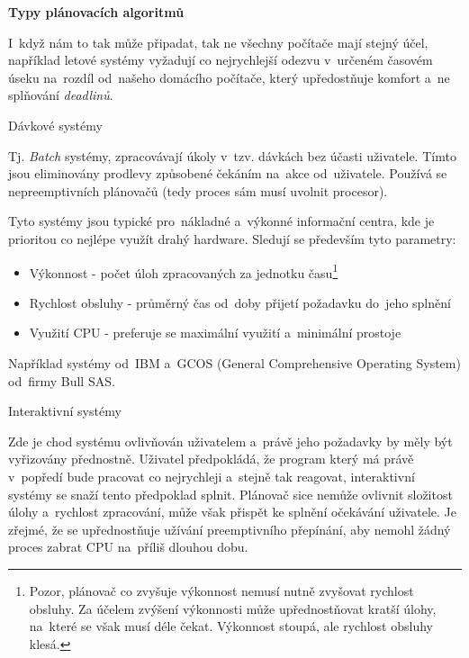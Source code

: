 \begin{Large}
    \textbf{Typy plánovacích algoritmů}
\end{Large}

I~když nám to tak může připadat, tak ne všechny počítače mají stejný účel, například letové systémy vyžadují co nejrychlejší odezvu v~určeném časovém úseku na~rozdíl od~našeho domácího počítače, který upředostňuje komfort a~ne splňování \emph{deadlinů}.

\begin{large}
    \vspace{0,5cm}
    Dávkové systémy
\end{large}

Tj. \emph{Batch} systémy, zpracovávají úkoly v~tzv. dávkách bez účasti uživatele. Tímto jsou eliminovány prodlevy způsobené čekáním na~akce od~uživatele. Používá se nepreemptivních plánovačů (tedy proces sám musí uvolnit procesor). 

\vspace{0,5cm}

Tyto systémy jsou typické pro~nákladné a~výkonné informační centra, kde je prioritou co nejlépe využít drahý hardware. Sledují se především tyto parametry:

\begin{itemize}
    \item Výkonnost - počet úloh zpracovaných za jednotku času\footnote{Pozor, plánovač co zvyšuje výkonnost nemusí nutně zvyšovat rychlost obsluhy. Za účelem zvýšení výkonnosti může upřednostňovat kratší úlohy, na~které se však musí déle čekat. Výkonnost stoupá, ale rychlost obsluhy klesá.} 
    \item Rychlost obsluhy - průměrný čas od~doby přijetí požadavku do~jeho splnění
    \item Využití CPU - preferuje se maximální využití a~minimální prostoje
\end{itemize}

Například systémy od~IBM a~GCOS (General Comprehensive Operating System) od~firmy Bull SAS.

\begin{large}
    \vspace{0,5cm}
    Interaktivní systémy
\end{large}

Zde je chod systému ovlivňován uživatelem a~právě jeho požadavky by měly být vyřizovány přednostně. Uživatel předpokládá, že program který má právě v~popředí bude pracovat co nejrychleji a~stejně tak reagovat, interaktivní systémy se snaží tento předpoklad splnit. Plánovač sice nemůže ovlivnit složitost úlohy a~rychlost zpracování, může však přispět ke splnění očekávání uživatele. Je zřejmé, že se upřednostňuje užívání preemptivního přepínání, aby nemohl žádný proces zabrat CPU na~příliš dlouhou dobu. 

